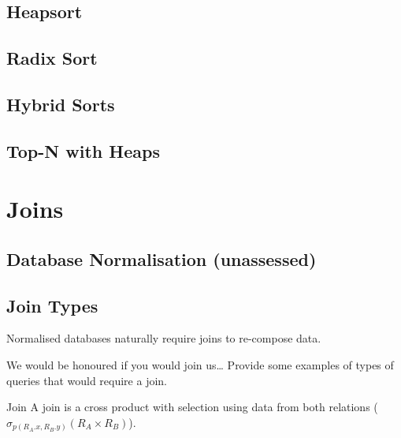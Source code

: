 \subsection{Heapsort}

\subsection{Radix Sort}

\subsection{Hybrid Sorts}

\subsection{Top-N with Heaps}

\unfinished

\section{Joins}
\subsection{Database Normalisation (unassessed)}
\unfinished

\subsection{Join Types}
Normalised databases naturally require joins to re-compose data.

\begin{examplebox}{We would be honoured if you would join us\dots}
    Provide some examples of types of queries that would require a join.
    \tcblower
    \unfinished
\end{examplebox}

\begin{definitionbox}{Join}
    A join is a cross product with selection using data from both relations ($\sigma_{p(R_A.x, R_B.y)} (R_A \times R_B)$).
\end{definitionbox}

